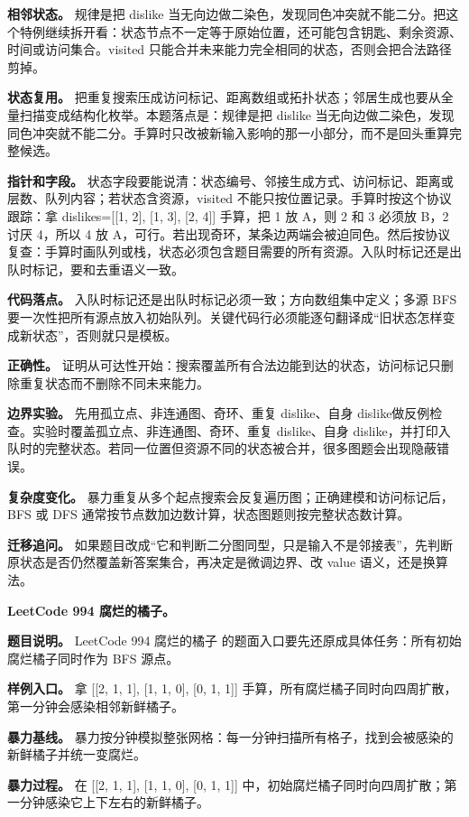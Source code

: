\textbf{相邻状态。} 规律是把 dislike 当无向边做二染色，发现同色冲突就不能二分。把这个特例继续拆开看：状态节点不一定等于原始位置，还可能包含钥匙、剩余资源、时间或访问集合。visited 只能合并未来能力完全相同的状态，否则会把合法路径剪掉。

\textbf{状态复用。} 把重复搜索压成访问标记、距离数组或拓扑状态；邻居生成也要从全量扫描变成结构化枚举。本题落点是：规律是把 dislike 当无向边做二染色，发现同色冲突就不能二分。手算时只改被新输入影响的那一小部分，而不是回头重算完整候选。

\textbf{指针和字段。} 状态字段要能说清：状态编号、邻接生成方式、访问标记、距离或层数、队列内容；若状态含资源，visited 不能只按位置记录。手算时按这个协议跟踪：拿 dislikes=[[1, 2], [1, 3], [2, 4]] 手算，把 1 放 A，则 2 和 3 必须放 B，2 讨厌 4，所以 4 放 A，可行。若出现奇环，某条边两端会被迫同色。然后按协议复查：手算时画队列或栈，状态必须包含题目需要的所有资源。入队时标记还是出队时标记，要和去重语义一致。

\textbf{代码落点。} 入队时标记还是出队时标记必须一致；方向数组集中定义；多源 BFS 要一次性把所有源点放入初始队列。关键代码行必须能逐句翻译成“旧状态怎样变成新状态”，否则就只是模板。

\textbf{正确性。} 证明从可达性开始：搜索覆盖所有合法边能到达的状态，访问标记只删除重复状态而不删除不同未来能力。

\textbf{边界实验。} 先用孤立点、非连通图、奇环、重复 dislike、自身 dislike做反例检查。实验时覆盖孤立点、非连通图、奇环、重复 dislike、自身 dislike，并打印入队时的完整状态。若同一位置但资源不同的状态被合并，很多图题会出现隐蔽错误。

\textbf{复杂度变化。} 暴力重复从多个起点搜索会反复遍历图；正确建模和访问标记后，BFS 或 DFS 通常按节点数加边数计算，状态图题则按完整状态数计算。

\textbf{迁移追问。} 如果题目改成“它和判断二分图同型，只是输入不是邻接表”，先判断原状态是否仍然覆盖新答案集合，再决定是微调边界、改 value 语义，还是换算法。

\noindent\textbf{LeetCode 994 腐烂的橘子。}

\textbf{题目说明。} LeetCode 994 腐烂的橘子 的题面入口要先还原成具体任务：所有初始腐烂橘子同时作为 BFS 源点。

\textbf{样例入口。} 拿 [[2, 1, 1], [1, 1, 0], [0, 1, 1]] 手算，所有腐烂橘子同时向四周扩散，第一分钟会感染相邻新鲜橘子。

\textbf{暴力基线。} 暴力按分钟模拟整张网格：每一分钟扫描所有格子，找到会被感染的新鲜橘子并统一变腐烂。

\textbf{暴力过程。} 在 [[2, 1, 1], [1, 1, 0], [0, 1, 1]] 中，初始腐烂橘子同时向四周扩散；第一分钟感染它上下左右的新鲜橘子。

